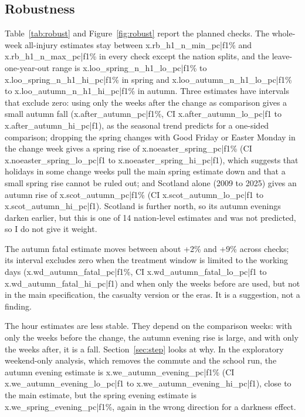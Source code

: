 \documentclass[11pt,a4paper]{article}
\begin{document}
\subsection{Robustness}
Table~\ref{tab:robust} and Figure~\ref{fig:robust} report the planned checks. The whole-week all-injury estimates stay between {{x.rb_h1_n_min_pc|f1}}\% and {{x.rb_h1_n_max_pc|f1}}\% in every check except the nation splits, and the leave-one-year-out range is {{x.loo_spring_n_h1_lo_pc|f1}}\% to {{x.loo_spring_n_h1_hi_pc|f1}}\% in spring and {{x.loo_autumn_n_h1_lo_pc|f1}}\% to {{x.loo_autumn_n_h1_hi_pc|f1}}\% in autumn. Three estimates have intervals that exclude zero: using only the weeks after the change as comparison gives a small autumn fall ({{x.after_autumn_pc|f1}}\%, CI {{x.after_autumn_lo_pc|f1}} to {{x.after_autumn_hi_pc|f1}}), as the seasonal trend predicts for a one-sided comparison; dropping the spring changes with Good Friday or Easter Monday in the change week gives a spring rise of {{x.noeaster_spring_pc|f1}}\% (CI {{x.noeaster_spring_lo_pc|f1}} to {{x.noeaster_spring_hi_pc|f1}}), which suggests that holidays in some change weeks pull the main spring estimate down and that a small spring rise cannot be ruled out; and Scotland alone (2009 to 2025) gives an autumn rise of {{x.scot_autumn_pc|f1}}\% (CI {{x.scot_autumn_lo_pc|f1}} to {{x.scot_autumn_hi_pc|f1}}). Scotland is further north, so its autumn evenings darken earlier, but this is one of 14 nation-level estimates and was not predicted, so I do not give it weight.

The autumn fatal estimate moves between about +2\% and +9\% across checks; its interval excludes zero when the treatment window is limited to the working days ({{x.wd_autumn_fatal_pc|f1}}\%, CI {{x.wd_autumn_fatal_lo_pc|f1}} to {{x.wd_autumn_fatal_hi_pc|f1}}) and when only the weeks before are used, but not in the main specification, the casualty version or the eras. It is a suggestion, not a finding.

The hour estimates are less stable. They depend on the comparison weeks: with only the weeks before the change, the autumn evening rise is large, and with only the weeks after, it is a fall. Section~\ref{sec:step} looks at why. In the exploratory weekend-only analysis, which removes the commute and the school run, the autumn evening estimate is {{x.we_autumn_evening_pc|f1}}\% (CI {{x.we_autumn_evening_lo_pc|f1}} to {{x.we_autumn_evening_hi_pc|f1}}), close to the main estimate, but the spring evening estimate is {{x.we_spring_evening_pc|f1}}\%, again in the wrong direction for a darkness effect.
\end{document}
